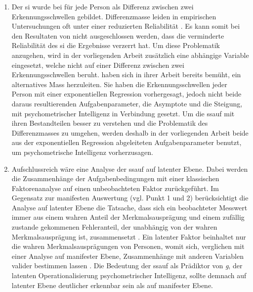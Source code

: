 \documentclass[11pt, twoside, a4paper]{book}		%
\begin{document}
\begin{enumerate}
	\item Der \gls{si} wurde bei \citet{Melnick2013} für jede Person als Differenz zwischen zwei Erkennungsschwellen gebildet. Differenzmasse leiden in empirischen Untersuchungen oft unter einer reduzierten Reliabilität \citep[][S. 145]{Murphy2005}. Es kann somit bei den Resultaten von \citeauthor{Melnick2013} nicht ausgeschlossen werden, dass die verminderte Reliabilität des \gls{si} die Ergebnisse verzerrt hat. Um diese Problematik anzugehen, wird in der vorliegenden Arbeit zusätzlich eine abhängige Variable eingesetzt, welche nicht auf einer Differenz zwischen zwei Erkennungsschwellen beruht. \citeauthor{Melnick2013} haben sich in ihrer Arbeit bereits bemüht, ein alternatives Mass herzuleiten. Sie haben die Erkennungsschwellen jeder Person mit einer exponentiellen Regression vorhergesagt, jedoch nicht beide daraus resultierenden Aufgabenparameter, die Asymptote und die Steigung, mit psychometrischer Intelligenz in Verbindung gesetzt. Um die \gls{ssauf} mit ihren Bestandteilen besser zu verstehen und die Problematik des Differenzmasses zu umgehen, werden deshalb in der vorliegenden Arbeit beide aus der exponentiellen Regression abgeleiteten Aufgabenparameter benutzt, um psychometrische Intelligenz vorherzusagen. 

	\item  Aufschlussreich wäre eine Analyse der \gls{ssauf} auf latenter Ebene. Dabei werden die Zusammenhänge der Aufgabenbedingungen mit einer klassischen Faktorenanalyse auf einen unbeobachteten Faktor zurückgeführt. Im Gegensatz zur manifesten Auswertung (vgl. Punkt 1 und 2) berücksichtigt die Analyse auf latenter Ebene die Tatsache, dass sich ein beobachteter Messwert immer aus einem wahren Anteil der Merkmalsausprägung und einem zufällig zustande gekommenen Fehleranteil, der unabhängig von der wahren Merkmalsausprägung ist, zusammensetzt \citep{Moosbrugger2007}. Ein latenter Faktor beinhaltet nur die wahren Merkmalsausprägungen von Personen, womit sich, verglichen mit einer Analyse auf manifester Ebene, Zusammenhänge mit anderen Variablen valider bestimmen lassen \citep[S. 9]{Kline2011}. Die Bedeutung der \gls{ssauf} als Prädiktor von \textit{g}, der latenten Operationalisierung psychometrischer Intelligenz, sollte demnach auf latenter Ebene deutlicher erkennbar sein als auf manifester Ebene.


\end{enumerate}
\end{document}
